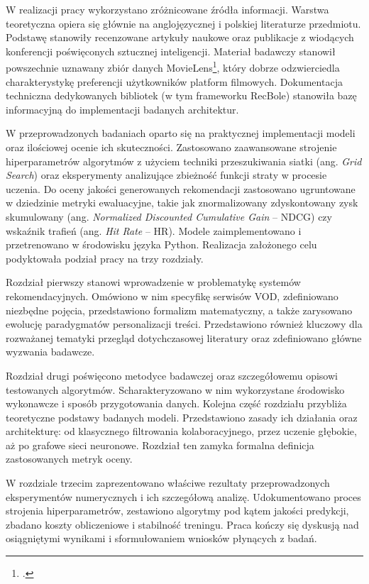 W realizacji pracy wykorzystano zróżnicowane źródła informacji. Warstwa teoretyczna opiera się głównie na anglojęzycznej i polskiej literaturze przedmiotu. Podstawę stanowiły recenzowane artykuły naukowe oraz publikacje z wiodących konferencji poświęconych sztucznej inteligencji. Materiał badawczy stanowił powszechnie uznawany zbiór danych MovieLens\footcite{MovieLens2013}, który dobrze odzwierciedla charakterystykę preferencji użytkowników platform filmowych. Dokumentacja techniczna dedykowanych bibliotek (w tym frameworku RecBole) stanowiła bazę informacyjną do implementacji badanych architektur.

W przeprowadzonych badaniach oparto się na praktycznej implementacji modeli oraz ilościowej ocenie ich skuteczności. Zastosowano zaawansowane strojenie hiperparametrów algorytmów z użyciem techniki przeszukiwania siatki (ang. \foreignlanguage{english}{\textit{Grid Search}}) oraz eksperymenty analizujące zbieżność funkcji straty w procesie uczenia. Do oceny jakości generowanych rekomendacji zastosowano ugruntowane w dziedzinie metryki ewaluacyjne, takie jak znormalizowany zdyskontowany zysk skumulowany (ang. \foreignlanguage{english}{\textit{Normalized Discounted Cumulative Gain}} -- NDCG) czy wskaźnik trafień (ang. \foreignlanguage{english}{\textit{Hit Rate}} -- HR). Modele zaimplementowano i przetrenowano w środowisku języka Python. Realizacja założonego celu podyktowała podział pracy na trzy rozdziały.

Rozdział pierwszy stanowi wprowadzenie w problematykę systemów rekomendacyjnych. Omówiono w nim specyfikę serwisów VOD, zdefiniowano niezbędne pojęcia, przedstawiono formalizm matematyczny, a także zarysowano ewolucję paradygmatów personalizacji treści. Przedstawiono również kluczowy dla rozważanej tematyki przegląd dotychczasowej literatury oraz zdefiniowano główne wyzwania badawcze.

Rozdział drugi poświęcono metodyce badawczej oraz szczegółowemu opisowi testowanych algorytmów. Scharakteryzowano w nim wykorzystane środowisko wykonawcze i sposób przygotowania danych. Kolejna część rozdziału przybliża teoretyczne podstawy badanych modeli. Przedstawiono zasady ich działania oraz architekturę: od klasycznego filtrowania kolaboracyjnego, przez uczenie głębokie, aż po grafowe sieci neuronowe. Rozdział ten zamyka formalna definicja zastosowanych metryk oceny.

W rozdziale trzecim zaprezentowano właściwe rezultaty przeprowadzonych eksperymentów numerycznych i ich szczegółową analizę. Udokumentowano proces strojenia hiperparametrów, zestawiono algorytmy pod kątem jakości predykcji, zbadano koszty obliczeniowe i stabilność treningu. Praca kończy się dyskusją nad osiągniętymi wynikami i sformułowaniem wniosków płynących z badań.
